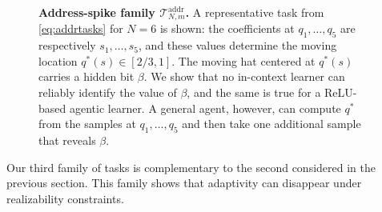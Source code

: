 \documentclass{article}
\begin{document}
\begin{figure}[htb]
\caption{\textbf{Address-spike family $\mathcal{T}_{N,m}^{\mathrm{addr}}$.} A representative task from \eqref{eq:addrtasks} for $N = 6$ is shown: the coefficients at $q_1,\dots,q_5$ are respectively $s_1,\dots,s_5$, and these values determine the moving location $q^\ast(s)\in[2/3,1]$. The moving hat centered at $q^\ast(s)$ carries a hidden bit $\beta$. We show that no in-context learner can reliably identify the value of $\beta$, and the same is true for a ReLU-based agentic learner. A general agent, however, can compute $q^\ast$ from the samples at $q_1,\dots,q_5$ and then take one additional sample that reveals $\beta$.}
\label{fig:address_spike}
\end{figure}







Our third family of tasks is complementary to the second considered in the previous section. 
This family shows that adaptivity can disappear under realizability constraints.
\end{document}
